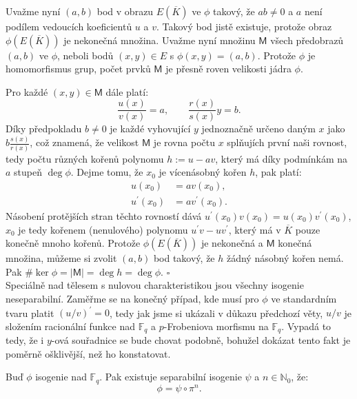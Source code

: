 \documentclass[12pt]{report}
\begin{document}
Uvažme nyní $(a,b)$ bod v obrazu $E(\overline{K})$ ve $\phi$ takový, že $ab \neq 0$ a $a$ není podílem vedoucích koeficientů $u$ a $v$. Takový bod jistě existuje, protože obraz $\phi(E(\overline{K}))$ je nekonečná množina. Uvažme nyní množinu $\mathsf{M}$ všech předobrazů $(a,b)$ ve $\phi$, neboli bodů $(x,y) \in E$ s $\phi(x,y) = (a,b)$. Protože $\phi$ je homomorfismus grup, počet prvků $\mathsf{M}$ je přesně roven velikosti jádra $\phi$.

Pro každé $(x,y) \in \mathsf{M}$ dále platí:
\begin{equation*}
\frac{u(x)}{v(x)} = a, \qquad \frac{r(x)}{s(x)}y = b.
\end{equation*}
Díky předpokladu $b \neq 0$ je každé vyhovující $y$ jednoznačně určeno daným $x$ jako $b \frac{s(x)}{r(x)}$, což znamená, že velikost $\mathsf{M}$ je rovna počtu $x$ splňujích první naši rovnost, tedy počtu různých kořenů polynomu $h:= u - av$, který má díky podmínkám na $a$ stupeň $\deg \phi$. Dejme tomu, že $x_0$ je vícenásobný kořen $h$, pak platí:
\begin{align*}
u(x_0) &= a v(x_0),\\
u^{\prime} (x_0)  &=  a v^{\prime} (x_0).
\end{align*}  
Násobení protějších stran těchto rovností dává $u^{\prime} (x_0) v (x_0) = u (x_0) v^{\prime} (x_0)$, $x_0$ je tedy kořenem (nenulového) polynomu $u^\prime v - u v^\prime$, který má v $\overline{K}$ pouze konečně mnoho kořenů. Protože $\phi(E(\overline{K}))$ je nekonečná a $\mathsf{M}$ konečná množina, můžeme si zvolit $(a,b)$ bod takový, že $h$ žádný násobný kořen nemá. Pak $\# \ker \phi = \vert \mathsf{M}\vert = \deg h = \deg \phi$. \hfill $\square$\\

Speciálně nad tělesem s nulovou charakteristikou jsou všechny isogenie neseparabilní. Zaměřme se na konečný případ, kde musí pro $\phi$ ve standardním tvaru platit $(u/v)^\prime =0$, tedy jak jsme si ukázali v důkazu předchozí věty, $u/v$ je složením racionální funkce nad $\mathbb{F}_q$ a $p$-Frobeniova morfismu na $\mathbb{F}_q$. Vypadá to tedy, že i $y$-ová souřadnice se bude chovat podobně, bohužel dokázat tento fakt je poměrně ošklivější, než ho konstatovat. 

\begin{dusledek}\label{separ2}
Buď $\phi$ isogenie nad $\mathbb{F}_q$. Pak existuje separabilní isogenie $\psi$ a $n \in \mathbb{N}_0$, že:
\begin{equation*}
\phi = \psi \circ \pi ^n.
\end{equation*}
\end{dusledek}
\end{document}

